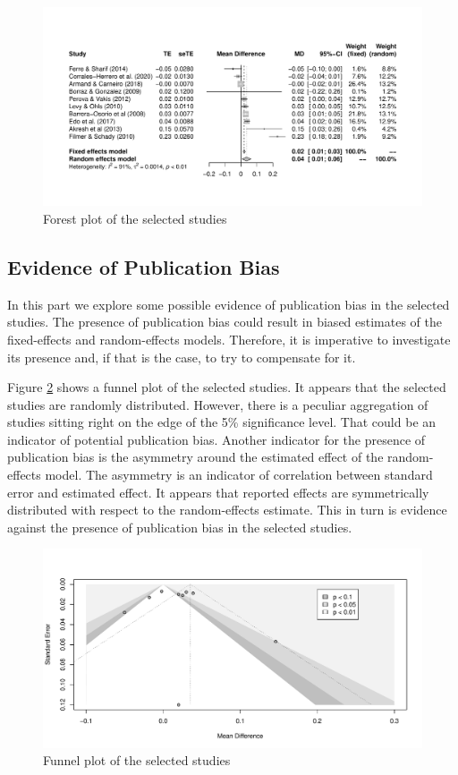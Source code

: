 \documentclass[a4paper, 10pt]{article}
\begin{document}
\begin{figure}[!htbp]
    \centering
    \includegraphics[width=16cm]{figures/forest_plot.pdf}
    \caption{Forest plot of the selected studies}
    \label{fig:forest}
\end{figure}


\subsection{Evidence of Publication Bias}
In this part we explore some possible evidence of publication bias in the selected studies. The presence of publication bias could result in biased estimates of the fixed-effects and random-effects models. Therefore, it is imperative to investigate its presence and, if that is the case, to try to compensate for it.

Figure \ref{fig:funnel} shows a funnel plot of the selected studies. It appears that the selected studies are randomly distributed. However, there is a peculiar aggregation of studies sitting right on the edge of the 5\% significance level. That could be an indicator of potential publication bias. Another indicator for the presence of publication bias is the asymmetry around the estimated effect of the random-effects model. The asymmetry is an indicator of correlation between standard error and estimated effect. It appears that reported effects are symmetrically distributed with respect to the random-effects estimate. This in turn is evidence against the presence of publication bias in the selected studies.
\begin{figure}[ht]
    \centering
    \includegraphics[width=16cm]{figures/funnel_plot.pdf}
    \caption{Funnel plot of the selected studies}
    \label{fig:funnel}
\end{figure}
\end{document}

